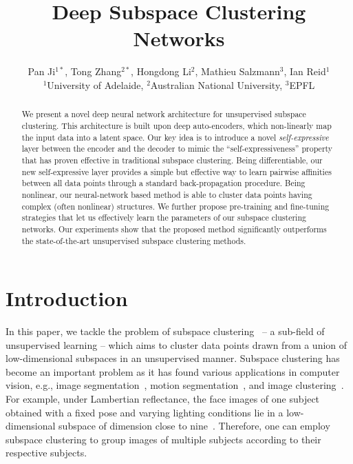 \documentclass{article}
\title{Deep Subspace Clustering Networks}
\author{
  Pan Ji$^{1*}$, Tong Zhang$^{2*}$, Hongdong Li$^2$, Mathieu Salzmann$^3$, Ian Reid$^1$\\
  $^1$University of Adelaide, $^2$Australian National University, $^3$EPFL 
}
\begin{document}
\setlength{\abovedisplayskip}{4pt}
\setlength{\belowdisplayskip}{4pt}

\maketitle
\begin{abstract}
We present a novel deep neural network architecture for unsupervised subspace clustering. This architecture is built upon deep auto-encoders, which non-linearly map the input data into a latent space. Our key idea is to introduce a novel \emph{self-expressive} layer between the encoder and the decoder to mimic the ``self-expressiveness'' property that has proven effective in traditional subspace clustering. Being differentiable, our new self-expressive layer provides a simple but effective way to learn pairwise affinities between all data points through a standard back-propagation procedure. Being nonlinear, our neural-network based method is able to cluster data points having complex (often nonlinear) structures. We further propose pre-training and fine-tuning strategies that let us effectively learn the parameters of our subspace clustering networks. Our experiments show that the proposed method significantly outperforms the state-of-the-art unsupervised subspace clustering methods.
\end{abstract}

\section{Introduction}

In this paper, we tackle the problem of subspace clustering~\cite{vidal2011subspace} -- a sub-field of unsupervised learning --  which aims to cluster data points drawn from a union of low-dimensional subspaces in an unsupervised manner. Subspace clustering has become an important problem as it has found various applications in computer vision, e.g., image segmentation~\cite{yang2008unsupervised,ma2007segmentation}, motion segmentation~\cite{kanatani2001motion,elhamifar2009sparse}, and image clustering~\cite{ho2003clustering,elhamifar2013sparse}. For example, under Lambertian reflectance, the face images of one subject obtained with a fixed pose and varying lighting conditions lie in a low-dimensional subspace of dimension close to nine~\cite{basri2003lambertian}. Therefore, one can employ subspace clustering to group images of multiple subjects according to their respective subjects.
\end{document}
